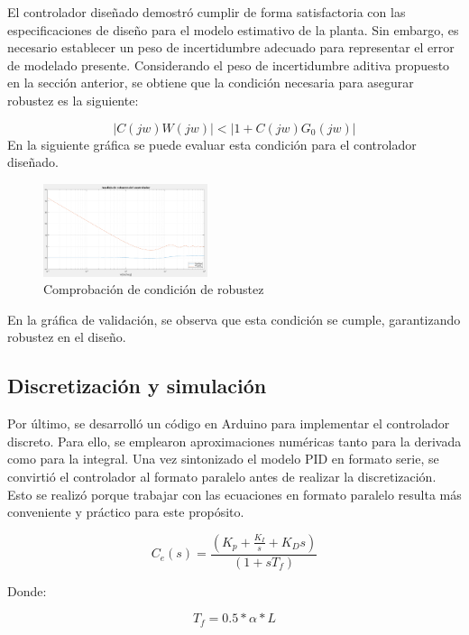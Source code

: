 \documentclass[letterpaper, 10 pt, conference]{ieeeconf}  %
\begin{document}
El controlador diseñado demostró cumplir de forma satisfactoria con las especificaciones de diseño para el modelo estimativo de la planta. Sin embargo, es necesario establecer un peso de incertidumbre adecuado para representar el error de modelado presente. Considerando el peso de incertidumbre aditiva propuesto en la sección anterior, se obtiene que la condición necesaria para asegurar robustez es la siguiente:

\begin{equation*}
  |C(jw)W(jw)| < |1 + C(jw)G_{0}(jw)|
\end{equation*}
En la siguiente gráfica se puede evaluar esta condición para el controlador diseñado.

\begin{figure}[H]
  \centering
  \includegraphics[width=0.43\textwidth]{./IMAGENES/pid6.png}
  \caption{Comprobación de condición de robustez}
  \label{fig:pid6}
\end{figure}

En la gráfica de validación, se observa que esta condición se cumple, garantizando robustez en el diseño.

\subsection{Discretización y simulación}

Por último, se desarrolló un código en Arduino para implementar el controlador discreto. Para ello, se emplearon aproximaciones numéricas tanto para la derivada como para la integral.
Una vez sintonizado el modelo PID en formato serie, se convirtió el controlador al formato paralelo antes de realizar la discretización. Esto se realizó porque trabajar con las ecuaciones en formato paralelo resulta más conveniente y práctico para este propósito.

\begin{equation*}
  C_{e}(s) = \frac{(K_p + \frac{K_I}{s} + K_{D}s)}{(1 + sT_{f})}
\end{equation*}

Donde:

\begin{equation*}
  T_{f} = 0.5 * \alpha * L
\end{equation*}
\end{document}
